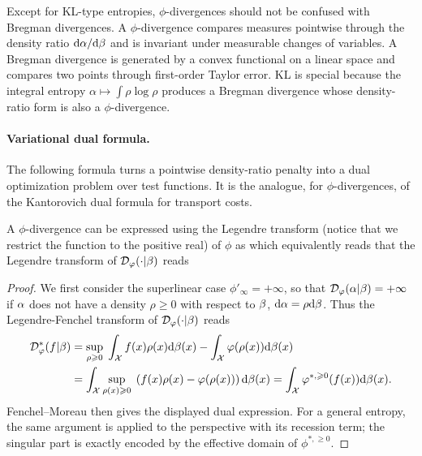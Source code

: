 \begin{rem}
	Except for KL-type entropies, $\phi$-divergences should not be confused with Bregman divergences. A $\phi$-divergence compares measures pointwise through the density ratio $\mathrm{d}\alpha/\mathrm{d}\beta$ and is invariant under measurable changes of variables. A Bregman divergence is generated by a convex functional on a linear space and compares two points through first-order Taylor error. KL is special because the integral entropy $\alpha\mapsto\int \rho\log\rho$ produces a Bregman divergence whose density-ratio form is also a $\phi$-divergence.
\end{rem}

\paragraph{Variational dual formula.}

The following formula turns a pointwise density-ratio penalty into a dual optimization problem over test functions. It is the analogue, for $\phi$-divergences, of the Kantorovich dual formula for transport costs.

\begin{proposition}
	A $\phi$-divergence can be expressed using the Legendre transform
	(notice that we restrict the function to the positive real)
	of $\phi$ as %
	which equivalently reads that the Legendre transform of $\mathcal{D}_\varphi(\cdot|\beta)$ reads
\end{proposition}

\begin{proof}
		We first consider the superlinear case $\phi'_\infty=+\infty$, so that $\mathcal{D}_\varphi(\alpha|\beta)=+\infty$ if $\alpha$ does not have a density $\rho \geq 0$ with respect to $\beta$, $\mathrm{d}\alpha=\rho \mathrm{d}\beta$. Thus the Legendre-Fenchel transform of $\mathcal{D}_\varphi(\cdot|\beta)$
	reads
	\begin{align*}
		\mathcal{D}_\varphi^*(f|\beta) &= \underset{\rho \geqslant 0}{\sup}\; \int_{\mathcal{X}} f(x) \rho(x)\mathrm{d}\beta(x) - \int_{\mathcal{X}} \varphi(\rho(x)) \mathrm{d}\beta(x)\\
			&= \int_{\mathcal{X}} \underset{\rho(x) \geqslant 0}{\sup}\; \left(  f(x) \rho(x) -\varphi(\rho(x))  \right)\mathrm{d}\beta(x)
		= \int_{\mathcal{X}} \varphi^{*,\geqslant 0}(f(x)) \mathrm{d}\beta(x).
	\end{align*}
		Fenchel--Moreau then gives the displayed dual expression. For a general entropy, the same argument is applied to the perspective with its recession term; the singular part is exactly encoded by the effective domain of $\phi^{*,\geq0}$.
	\end{proof}


